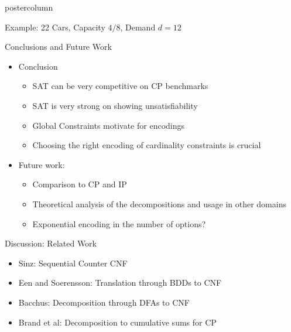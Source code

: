 \documentclass[final]{beamer}
\begin{document}
\begin{frame}
\begin{columns}
\begin{column}{.49\textwidth}
\begin{beamercolorbox}[center,wd=\textwidth]{postercolumn}
\begin{minipage}[T]{.95\textwidth}
{\begin{block}{Example: 22 Cars, Capacity $4/8$, Demand $d=12$}
                
            \end{block}
            \vfill
            \begin{block}{Conclusions and Future Work}
                \begin{itemize}
                \item Conclusion
                    \begin{itemize}
                    \itemsep1pt\parskip0pt
                    \item
                      SAT can be very competitive on CP benchmarks
                    \item
                      SAT is very strong on showing unsatisfiability
                    \item
                      Global Constraints motivate for encodings
                    \item
                      Choosing the right encoding of cardinality constraints is crucial
                    \end{itemize}
                \item Future work:
                    \begin{itemize}
                    \itemsep1pt\parskip0pt
                    \item
                      Comparison to CP and IP
                    \item
                      Theoretical analysis of the decompositions and usage in other domains
                    \item
                      Exponential encoding in the number of options?
                    \end{itemize}
                \end{itemize}
            \end{block}
            \vfill
            \begin{block}{Discussion: Related Work}
                \begin{itemize}
                \item
                  Sinz: Sequential Counter CNF \cite{Sinz05}
                \item
                  Een and Soerensson: Translation through BDDs to CNF \cite{Een06}
                \item
                  Bacchus: Decomposition through DFAs to CNF \cite{Bacchus07}
                \item
                  Brand et al: Decomposition to cumulative sums for CP \cite{Brand07}

\end{itemize}
\end{block}}
\end{minipage}
\end{beamercolorbox}
\end{column}
\end{columns}
\end{frame}
\end{document}

